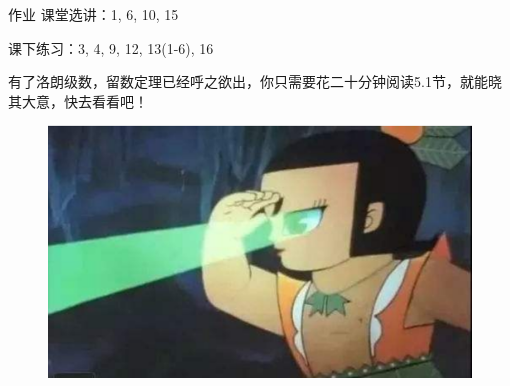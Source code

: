\documentclass[11pt]{beamer}
\newcommand{\kong}[1][0.5]{\vspace{#1cm}}
\begin{document}
\begin{frame}{作业}
课堂选讲：1, 6, 10, 15

\kong[1]
课下练习：3, 4, 9, 12, 13(1-6), 16

\kong[1]
{\color{blue} 有了洛朗级数，留数定理已经呼之欲出，你只需要花二十分钟阅读5.1节，就能晓其大意，快去看看吧！}
\begin{figure}
	\centering
	\includegraphics[width=0.3\linewidth]{二娃}
	\label{fig:}
\end{figure}


\end{frame}
\end{document}

